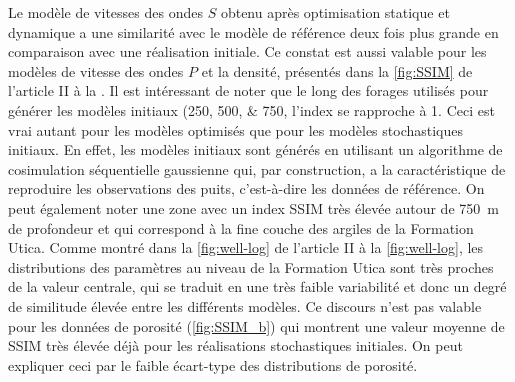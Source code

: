 Le modèle de vitesses des ondes $S$ obtenu après optimisation statique et
dynamique a une similarité avec le modèle de référence deux fois plus grande
en comparaison avec une réalisation initiale. Ce constat est aussi valable pour les
modèles de vitesse des ondes $P$ et la densité, présentés dans la
\cref{fig:SSIM} de l'article II à la . Il est intéressant de
noter que le long des forages utilisés pour générer les modèles initiaux
(\numlist{250;500;750}, l'index se rapproche à \num{1}. Ceci est vrai autant
pour les modèles optimisés que pour les modèles stochastiques initiaux. En
effet, les modèles initiaux sont générés en utilisant un algorithme de
cosimulation séquentielle gaussienne qui, par construction, a la caractéristique
de reproduire les observations des puits, c'est-à-dire les données de référence.
On
peut également noter une zone avec un index SSIM très élevée autour de
\SI{750}{\metre} de profondeur et qui correspond à la fine couche des argiles de
la Formation Utica. Comme montré dans la \cref{fig:well-log} de l'article II à
la \cref{fig:well-log}, les distributions des paramètres au niveau de la
Formation Utica sont très proches de la valeur centrale, qui se traduit en une
très faible variabilité et donc un degré de similitude élevée entre les
différents modèles. Ce discours n’est pas valable pour les données de porosité
(\cref{fig:SSIM_b}) qui montrent une valeur moyenne de SSIM très élevée déjà
pour les
réalisations stochastiques initiales. On peut expliquer ceci par le faible
écart-type des distributions de porosité.\\

